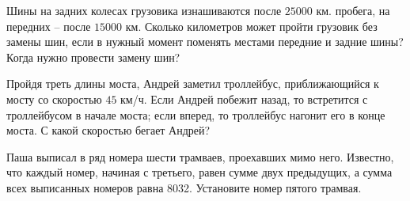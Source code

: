 ﻿
\begin{itemize}

\itA Шины на задних колесах грузовика изнашиваются после $25 000$ км. пробега, на передних -- после $15 000$ км. Сколько километров может пройти грузовик без замены шин, если в нужный момент поменять местами передние и задние шины? Когда нужно провести замену шин?

\itB Пройдя треть длины моста, Андрей заметил троллейбус, приближающийся к мосту со скоростью $45$ км/ч. Если Андрей побежит назад, то встретится с троллейбусом в начале моста; если вперед, то троллейбус нагонит его в конце моста. С какой скоростью бегает Андрей?

\itC Паша выписал в ряд номера шести трамваев, проехавших мимо него. Известно, что каждый номер, начиная с третьего, равен сумме двух предыдущих, а сумма всех выписанных номеров равна 8032. Установите номер пятого трамвая.
\end{itemize}